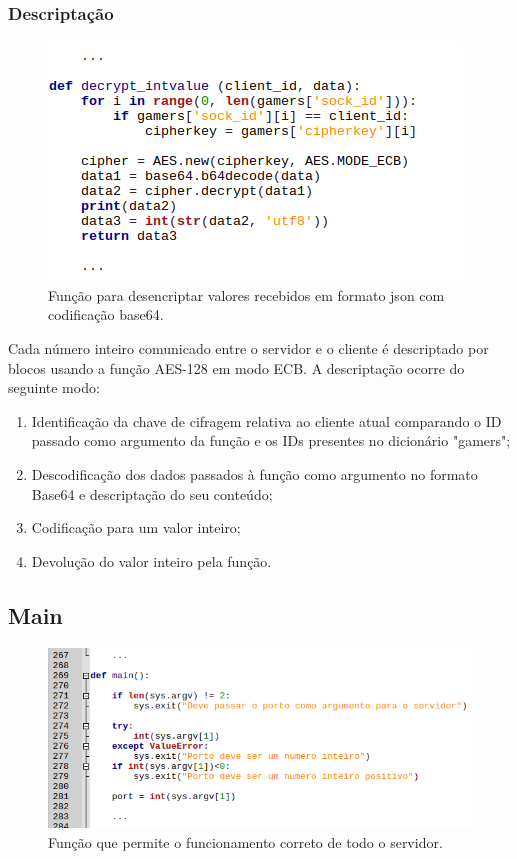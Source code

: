 \documentclass{report}
\begin{document}
\subsubsection{Descriptação}
\begin{figure}[H]
        \centering
        \includegraphics[scale=0.65]{decrypt_intvalue}  
        \caption{Função para desencriptar valores recebidos em formato json com codificação base64.}
\end{figure}
Cada número inteiro comunicado entre o servidor e o cliente é descriptado por blocos usando a função AES-128 em modo ECB. A descriptação ocorre do seguinte modo:
\begin{enumerate}
\item Identificação da chave de cifragem relativa ao cliente atual comparando o ID passado como argumento da função e os IDs presentes no dicionário "gamers";
\item Descodificação dos dados passados à função como argumento no formato Base64 e descriptação do seu conteúdo;
\item Codificação para um valor inteiro;
\item Devolução do valor inteiro pela função.
\end{enumerate}

\subsection{Main}
\begin{figure}[H]
        \centering
        \includegraphics[scale=0.65]{main}      
        \caption{Função que permite o funcionamento correto de todo o servidor.}
\end{figure}
\end{document}
